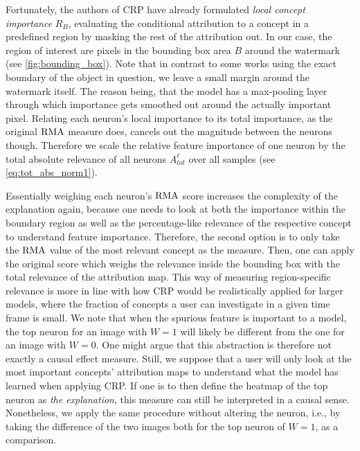 Fortunately, the authors of CRP have already formulated \textit{local concept importance} $R_B$, evaluating the conditional attribution to a concept in a predefined region by masking the rest of the attribution out. In our case, the region of interest are pixels in the bounding box area $B$ around the watermark (see \cref{fig:bounding_box}). Note that in contrast to some works using the exact boundary of the object in question, we leave a small margin around the watermark itself. The reason being, that the model has a max-pooling layer through which importance gets smoothed out around the actually important pixel. Relating each neuron's local importance to its total importance, as the original $\operatorname*{RMA}$ measure does, cancels out the magnitude between the neurons though. Therefore we scale the relative feature importance of one neuron by the total absolute relevance of all neurons $A_{tot}^{\ell}$ over all samples (see \cref{eq:tot_abs_norm1}). 

Essentially weighing each neuron's $\operatorname*{RMA}$ score increases the complexity of the explanation again, because one needs to look at both the importance within the boundary region as well as the percentage-like relevance of the respective concept to understand feature importance. 
Therefore, the second option is to only take the $\operatorname*{RMA}$ value of the most relevant concept as the measure. Then, one can apply the original score which weighs the relevance inside the bounding box with the total relevance of the attribution map. This way of measuring region-specific relevance is more in line with how CRP would be realistically applied for larger models, where the fraction of concepts a user can investigate in a given time frame is small. We note that when the spurious feature is important to a model, the top neuron for an image with $W=1$ will likely be different from the one for an image with $W=0$. One might argue that this abstraction is therefore not exactly a causal effect measure. Still, we suppose that a user will only look at the most important concepts' attribution maps to understand what the model has learned when applying CRP. If one is to then define the heatmap of the top neuron as \textit{the explanation}, this measure can still be interpreted in a causal sense. Nonetheless, we apply the same procedure without altering the neuron, i.e., by taking the difference of the two images both for the top neuron of $W=1$, as a comparison.

